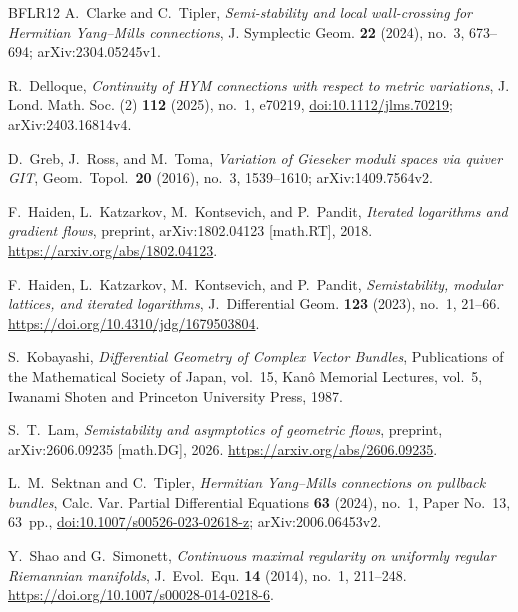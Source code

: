 \documentclass[11pt]{amsart}
\theoremstyle{definition}
\theoremstyle{remark}
\begin{document}
\begin{thebibliography}{BFLR12}
 A.~Clarke and C.~Tipler, \emph{Semi-stability and local wall-crossing for Hermitian Yang--Mills connections}, J. Symplectic Geom. \textbf{22} (2024), no.~3, 673--694; arXiv:2304.05245v1.

 R.~Delloque, \emph{Continuity of HYM connections with respect to metric variations}, J. Lond. Math. Soc. (2) \textbf{112} (2025), no.~1, e70219, \href{https://doi.org/10.1112/jlms.70219}{doi:10.1112/jlms.70219}; arXiv:2403.16814v4.

D.~Greb, J.~Ross, and M.~Toma,
\emph{Variation of Gieseker moduli spaces via quiver GIT},
Geom.\ Topol.\ \textbf{20} (2016), no.~3, 1539--1610;
arXiv:1409.7564v2.

 F.~Haiden, L.~Katzarkov, M.~Kontsevich, and P.~Pandit, \emph{Iterated logarithms and gradient flows}, preprint, arXiv:1802.04123 [math.RT], 2018. \url{https://arxiv.org/abs/1802.04123}.

 F.~Haiden, L.~Katzarkov, M.~Kontsevich, and P.~Pandit, \emph{Semistability, modular lattices, and iterated logarithms}, J.\ Differential Geom. \textbf{123} (2023), no.~1, 21--66. \url{https://doi.org/10.4310/jdg/1679503804}.

 S.~Kobayashi, \emph{Differential Geometry of Complex Vector Bundles}, Publications of the Mathematical Society of Japan, vol.~15, Kan\^o Memorial Lectures, vol.~5, Iwanami Shoten and Princeton University Press, 1987.

 S.~T.~Lam, \emph{Semistability and asymptotics of geometric flows}, preprint, arXiv:2606.09235 [math.DG], 2026. \url{https://arxiv.org/abs/2606.09235}.

 L.~M.~Sektnan and C.~Tipler, \emph{Hermitian Yang--Mills connections on pullback bundles}, Calc. Var. Partial Differential Equations \textbf{63} (2024), no.~1, Paper No.~13, 63~pp., \href{https://doi.org/10.1007/s00526-023-02618-z}{doi:10.1007/s00526-023-02618-z}; arXiv:2006.06453v2.

 Y.~Shao and G.~Simonett, \emph{Continuous maximal regularity on uniformly regular Riemannian manifolds}, J.\ Evol.\ Equ. \textbf{14} (2014), no.~1, 211--248. \url{https://doi.org/10.1007/s00028-014-0218-6}.


\end{thebibliography}
\end{document}
